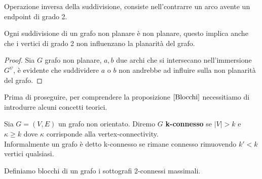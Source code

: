 \begin{definizione}[Contrazione]
    Operazione inversa della suddivisione, consiste nell'contrarre un arco avente un endpoint di grado 2.
\end{definizione}
\begin{proposizione}
    Ogni suddivisione di un grafo non planare è non planare, questo implica anche che i vertici di grado 2 non influenzano la planarità del grafo.
    \begin{proof}
        Sia \(G\) grafo non planare, \(a,b\) due archi che si intersecano nell'immersione \(G^\psi\), è evidente che suddividere \(a\) o \(b\) non andrebbe ad influire sulla non planarità del grafo.
    \end{proof}
\end{proposizione}
Prima di proseguire, per comprendere la proposizione \(\ref{Blocchi}\) necessitiamo di introdurre alcuni concetti teorici.
\begin{definizione}
    Sia \(G=(V,E)\) un grafo non orientato. Diremo \(G\) \textbf{k-connesso} se \(|V|>k\) e \(\kappa \geq k\) dove \(\kappa\) corrisponde alla vertex-connectivity.\\
    Informalmente un grafo è detto k-connesso se rimane connesso rimuovendo \(k'<k\) vertici qualsiasi.
\end{definizione}
\begin{definizione}[Blocco]
    Definiamo blocchi di un grafo i sottografi 2-connessi massimali.
\end{definizione}

